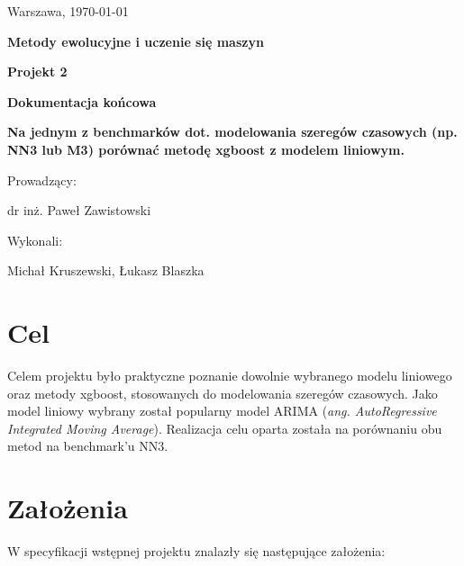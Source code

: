 \documentclass[11pt]{report}
\begin{document}
\thispagestyle{empty}

\begin{flushright}
\large{Warszawa, \today}
\end{flushright}

\vspace{5 cm}

\begin{center}
\LARGE{\textbf{Metody ewolucyjne i uczenie się maszyn}}

\vspace{5 mm}

\Large{\textbf{Projekt 2}}

\Large{\textbf{Dokumentacja końcowa}}

\vspace{5 mm}

\Large{\textbf{Na jednym z benchmarków dot. modelowania szeregów czasowych (np. NN3 lub M3) porównać metodę xgboost z modelem liniowym.}}
\end{center}

\vspace{3 cm}

\begin{flushright}
\large{Prowadzący:}

\large{dr inż. Paweł Zawistowski}
\end{flushright}

\vspace{1 cm}

\begin{flushright}
\large{Wykonali:}

\large{Michał Kruszewski, Łukasz Blaszka}
\end{flushright}

\newpage

\tableofcontents
\newpage

\section{Cel}
Celem projektu było praktyczne poznanie dowolnie wybranego modelu liniowego oraz metody xgboost, stosowanych do modelowania szeregów czasowych.
Jako model liniowy wybrany został popularny model ARIMA (\textit{ang. AutoRegressive Integrated Moving Average}).
Realizacja celu oparta została na porównaniu obu metod na benchmark'u NN3.

\section{Założenia}
W specyfikacji wstępnej projektu znalazły się następujące założenia:
\end{document}
